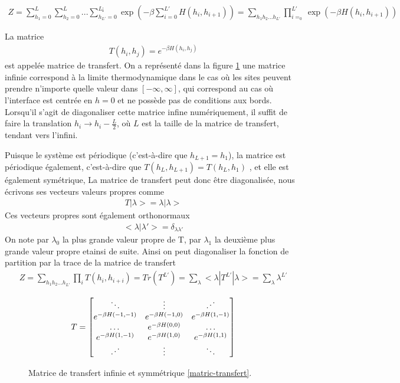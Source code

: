 \begin{align}
 Z = \sum_{h_1=0}^{L} \sum_{h_2=0}^{L}... \sum_{h_{L'}=0}^{L¡} \exp(- \beta \sum_{i=0}^{L'} H(h_i,h_{i+1}))
   = \sum_{h_1 h_2 ... h_{L'}} \prod_{i=_0}^{L'} \exp(-\beta H(h_i,h_{i+1}))
\end{align}

La matrice 
\begin{align}
    T(h_i,h_j) = e^{-\beta H(h_i,h_j)}
    \label{matric-transfert}
\end{align}
est appelée matrice de transfert. On a représenté dans la figure \ref{mat-inf} une matrice infinie correspond à la limite thermodynamique dans le cas où les sites peuvent prendre n'importe quelle valeur dans $[-\infty,\infty]$, qui correspond au cas où l'interface est centrée en $h=0$ et ne possède pas de conditions aux bords. Lorsqu'il s'agit de diagonaliser cette matrice infine numériquement, il suffit de faire la translation $h_i \to h_i - \frac{L}{2}$, où $L$ est la taille de la matrice de transfert, tendant vers l'infini.

Puisque le système est périodique (c'est-à-dire que $h_{L+1} = h_1$),  la matrice est périodique également, c'est-à-dire que $T(h_L,h_{L+1}) = T(h_L,h_1)$ \cite{pearce_exact_1989}, et elle est également symétrique, La matrice de transfert peut donc être diagonalisée, nous écrivons ses vecteurs valeurs propres comme
\begin{align}
    T | \lambda> = \lambda |\lambda>
\end{align}
Ces vecteurs propres sont également orthonormaux 
\begin{align}
    < \lambda | \lambda'> = \delta_{\lambda \lambda'}
\end{align}
On note par $\lambda_0$ la plus grande valeur propre de T, par $\lambda_1$ la deuxième plus grande valeur propre etainsi de suite. 
Ainsi on peut diagonaliser la fonction de partition par la trace de la matrice de transfert \cite{abraham_transfer_1973}
\begin{align}
  Z = \sum_{h_1 h_2 ... h_{L'}} \prod_{i} T(h_i,h_{i+i}) = Tr( T^{L'})  = \sum_\lambda <\lambda | T^{L'} | \lambda> = \sum_\lambda \lambda^{L'}
  \label{partition-trace-lambda}
\end{align}

\begin{figure}
    \begin{align}
    T = \begin{bmatrix} 
            \ddots & \vdots & \reflectbox{$\ddots$} \\ 
            e^{-\beta H(-1,-1)} &  e^{-\beta H(-1,0)} & e^{-\beta H(1,-1)} \\
            \dots & e^{-\beta H(0,0)} & \dots  \\
            e^{-\beta H(1,-1)} & e^{-\beta H(1,0)} & e^{-\beta H(1,1)}   \\ 
             \reflectbox{$\ddots$} & \vdots &\ddots  \\ 
        \end{bmatrix}
    \end{align}
    \caption{Matrice de transfert infinie et symmétrique \ref{matric-transfert}.}
    \label{mat-inf}
\end{figure}

